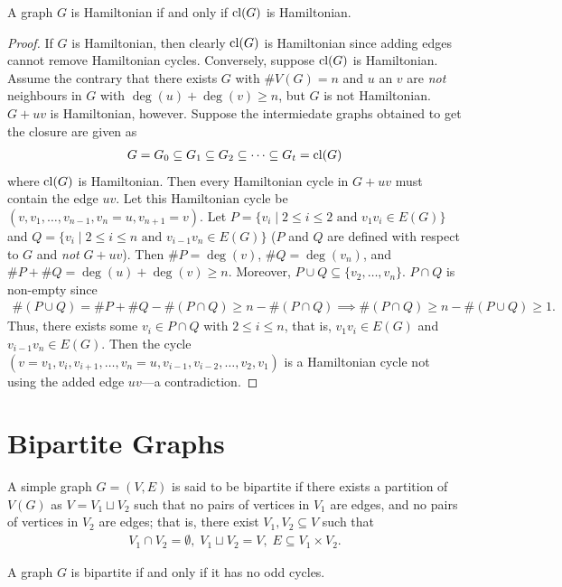 \begin{lemma}
    A graph $G$ is Hamiltonian if and only if $\operatorname{cl}(G)$ is Hamiltonian.
\end{lemma}
\begin{proof}
    If $G$ is Hamiltonian, then clearly $\operatorname{cl}(G)$ is Hamiltonian since adding edges cannot remove Hamiltonian cycles. Conversely, suppose $\operatorname{cl}(G)$ is Hamiltonian. Assume the contrary that there exists $G$ with $\#V(G) = n$ and $u$ an $v$ are \textit{not} neighbours in $G$ with $\deg(u)+\deg(v) \geq n$, but $G$ is not Hamiltonian. $G+uv$ is Hamiltonian, however. Suppose the intermiedate graphs obtained to get the closure are given as
    \begin{align}
        G = G_{0} \subseteq G_{1} \subseteq G_{2} \subseteq \cdots \subseteq G_{t} = \operatorname{cl}(G)
    \end{align}
    where $\operatorname{cl}(G)$ is Hamiltonian. Then every Hamiltonian cycle in $G+uv$ must contain the edge $uv$. Let this Hamiltonian cycle be $(v,v_{1},\ldots,v_{n-1},v_{n} = u,v_{n+1}=v)$. Let $P = \{v_{i} \mid 2 \leq i \leq 2 \text{ and } v_{1}v_{i} \in E(G)\}$ and $Q = \{v_{i} \mid 2 \leq i \leq n \text{ and } v_{i-1}v_{n} \in E(G)\}$ ($P$ and $Q$ are defined with respect to $G$ and \textit{not} $G+uv$). Then $\#P = \deg(v)$, $\#Q = \deg(v_{n})$, and $\#P+\#Q = \deg(u) + \deg(v) \geq n$. Moreover, $P \cup Q \subseteq \{v_{2},\ldots,v_{n}\}$. $P \cap Q$ is non-empty since
    \begin{align}
        \#(P \cup Q) = \#P + \#Q - \#(P \cap Q) \geq n-\#(P \cap Q) \implies \#(P \cap Q) \geq n-\#(P \cup Q) \geq 1.
    \end{align}
    Thus, there exists some $v_{i} \in P \cap Q$ with $2 \leq i \leq n$, that is, $v_{1}v_{i} \in E(G)$ and $v_{i-1}v_{n} \in E(G)$. Then the cycle $(v=v_{1},v_{i},v_{i+1},\ldots,v_{n}=u,v_{i-1},v_{i-2},\ldots,v_{2},v_{1})$ is a Hamiltonian cycle not using the added edge $uv$---a contradiction.
\end{proof}

\section{Bipartite Graphs}

A simple graph $G = (V,E)$ is said to be bipartite if there exists a partition of $V(G)$ as $V = V_{1} \sqcup V_{2}$ such that no pairs of vertices in $V_{1}$ are edges, and no pairs of vertices in $V_{2}$ are edges; that is, there exist $V_{1},V_{2} \subseteq V$ such that
\begin{align}
    V_{1} \cap V_{2} = \emptyset,\; V_{1} \sqcup V_{2} = V,\; E \subseteq V_{1} \times V_{2}.
\end{align}

\begin{theorem}
    A graph $G$ is bipartite if and only if it has no odd cycles.
\end{theorem}
